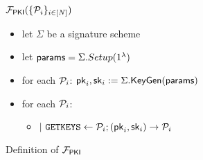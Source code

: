 \begin{figure}[h!]
  \begin{boxedminipage}{\columnwidth}
    \begin{centering}
      \textbf{$\F{PKI}({\Ps})$} \\
    \end{centering}
    \small
    \begin{itemize}
    \item[] let $\Sigma$ be a signature scheme~
    \item[] let $\msf{params} = \Sigma.Setup(1^\lambda)$
    \item[] for each $\P_i$: $\pk_i,\sk_i := \Sigma.\msf{KeyGen}(\msf{params})$
    \item[] for each $\P_i$:
      \begin{itemize}[leftmargin=2mm]
      \item[] $|~ \mtt{GETKEYS} \leftarrow \P_i; (\pk_i,\sk_i) \rightarrow \P_i$
      \end{itemize}
    \end{itemize}
  \end{boxedminipage}
  \caption{
    \label{fig:f_pki}
    Definition of $\F{PKI}$
  }
\end{figure}


